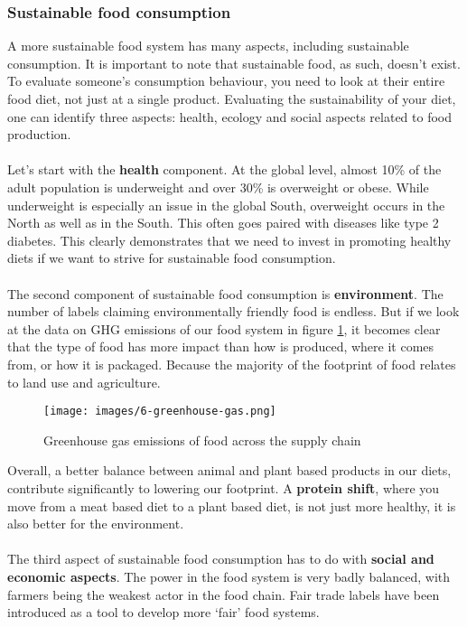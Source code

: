 \documentclass[../summary.tex]{subfiles}
\begin{document}
	\newpage
	\subsubsection{Sustainable food consumption}
	
	A more sustainable food system has many aspects, including sustainable consumption. It is important to note that sustainable food, as such, doesn't exist. To evaluate someone's consumption behaviour, you need to look at their entire food diet, not just at a single product. Evaluating the sustainability of your diet, one can identify three aspects: health, ecology and social aspects related to food production.
	\\\\
	Let's start with the \textbf{health} component. At the global level, almost 10\% of the adult population is underweight and over 30\% is overweight or obese. While underweight is especially an issue in the global South, overweight occurs in the North as well as in the South. This often goes paired with diseases like type 2 diabetes. This clearly demonstrates that we need to invest in promoting healthy diets if we want to strive for sustainable food consumption.
	\\\\
	The second component of sustainable food consumption is \textbf{environment}. The number of labels claiming environmentally friendly food is endless. But if we look at the data on GHG emissions of our food system in figure \ref{fig:greenhouse-gas}, it becomes clear that the type of food has more impact than how is produced, where it comes from, or how it is packaged. Because the majority of the footprint of food relates to land use and agriculture. 
	
	\begin{figure}[htbp]
		\centering
		\texttt{[image: images/6-greenhouse-gas.png]}
		\caption{Greenhouse gas emissions of food across the supply chain}
		\label{fig:greenhouse-gas}
	\end{figure}
	
	Overall, a better balance between animal and plant based products in our diets, contribute significantly to lowering our footprint. A \textbf{protein shift}, where you move from a meat based diet to a plant based diet, is not just more healthy, it is also better for the environment. 
	\\\\
	The third aspect of sustainable food consumption has to do with \textbf{social and economic aspects}. The power in the food system is very badly balanced, with farmers being the weakest actor in the food chain. Fair trade labels have been introduced as a tool to develop more `fair' food systems.
	
\end{document}
